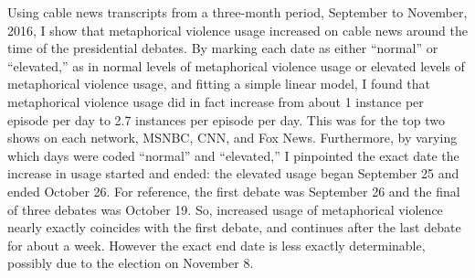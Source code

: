 Using cable news transcripts from a three-month period, September to November, 2016, 
I show that metaphorical violence usage
increased on cable news around the time of the presidential debates. By 
marking each date as either ``normal'' or ``elevated,'' as in normal levels
of metaphorical violence usage or elevated levels of metaphorical violence
usage, and fitting a simple linear model, I found that metaphorical violence
usage did in fact increase from about 1 instance per episode per day to 
2.7 instances per episode per day. This was for the top two shows on each network, MSNBC,
CNN, and Fox News. Furthermore, by varying which days were coded ``normal''
and ``elevated,'' I pinpointed the exact date the increase in usage started and
ended: the elevated usage began September 25 and ended October 26. For reference,
the first debate was September 26 and the final of three debates was October
19. So, increased usage of metaphorical violence nearly exactly coincides with
the first debate, and continues after the last debate for about a week. However
the exact end date is less exactly determinable, possibly due to the election
on November 8.
